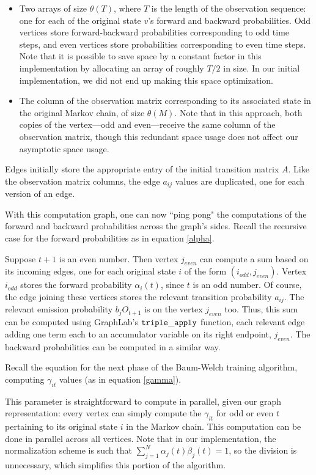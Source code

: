 \begin{itemize}
	\item Two arrays of size $\theta(T)$, where $T$ is the length of the observation sequence: one for each of the original state $v$'s forward and backward probabilities.  Odd vertices store forward-backward probabilities corresponding to odd time steps, and even vertices store probabilities corresponding to even time steps.  Note that it is possible to save space by a constant factor in this implementation by allocating an array of roughly $T/2$ in size.  In our initial implementation, we did not end up making this space optimization.  
	
	\item The column of the observation matrix corresponding to its associated state in the original Markov chain, of size $\theta(M)$.  Note that in this approach, both copies of the vertex---odd and even---receive the same column of the observation matrix, though this redundant space usage does not affect our asymptotic space usage.
\end{itemize}

Edges initially store the appropriate entry of the initial transition matrix $A$.  Like the observation matrix columns, the edge $a_{ij}$ values are duplicated, one for each version of an edge.

With this computation graph, one can now ``ping pong" the computations of the forward and backward probabilities across the graph's sides.  Recall the recursive case for the forward probabilities as in equation \ref{alpha}.

Suppose $t+1$ is an even number.  Then vertex $j_{even}$ can compute a sum based on its incoming edges, one for each original state $i$ of the form $(i_{odd}, j_{even})$.  Vertex $i_{odd}$ stores the forward probability $\alpha_{i}(t)$, since $t$ is an odd number.  Of course, the edge joining these vertices stores the relevant transition probability $a_{ij}$.  The relevant emission probability $b_jO_{t + 1}$ is on the vertex $j_{even}$ too.  Thus, this sum can be computed using GraphLab's $\tt{triple\_apply}$ function, each relevant edge adding one term each to an accumulator variable on its right endpoint, $j_{even}$.  The backward probabilities can be computed in a similar way.

Recall the equation for the next phase of the Baum-Welch training algorithm, computing $\gamma_{it}$ values (as in equation \ref{gamma}).

This parameter is straightforward to compute in parallel, given our graph representation: every vertex can simply compute the $\gamma_{it}$ for odd or even $t$ pertaining to its original state $i$ in the Markov chain.  This computation can be done in parallel across all vertices.   Note that in our implementation, the normalization scheme is such that $\sum_{j = 1}^N \alpha_{j}(t)\beta_{j}(t) = 1$, so the division is unnecessary, which simplifies this portion of the algorithm.

